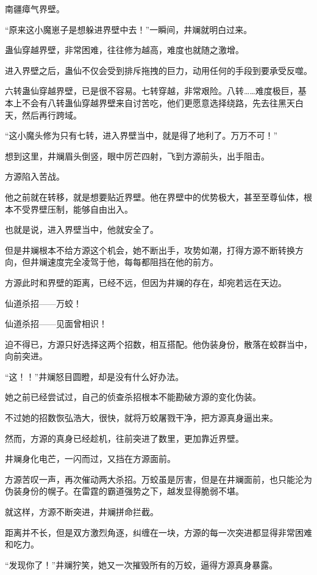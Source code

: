 \begin{this_body}
南疆瘴气界壁。

“原来这小魔崽子是想躲进界壁中去！”一瞬间，井斓就明白过来。

蛊仙穿越界壁，非常困难，往往修为越高，难度也就随之激增。

进入界壁之后，蛊仙不仅会受到排斥拖拽的巨力，动用任何的手段到要承受反噬。

六转蛊仙穿越界壁，已是很不容易。七转穿越，非常艰险。八转……难度极巨，基本上不会有八转蛊仙穿越界壁来自讨苦吃，他们更愿意选择绕路，先去往黑天白天，然后再行跨域。

“这小魔头修为只有七转，进入界壁当中，就是得了地利了。万万不可！”

想到这里，井斓眉头倒竖，眼中厉芒四射，飞到方源前头，出手阻击。

方源陷入苦战。

他之前就在转移，就是想要贴近界壁。他在界壁中的优势极大，甚至至尊仙体，根本不受界壁压制，能够自由出入。

也就是说，进入界壁当中，他就安全了。

但是井斓根本不给方源这个机会，她不断出手，攻势如潮，打得方源不断转换方向，但井斓速度完全凌驾于他，每每都阻挡在他的前方。

方源此时和界壁的距离，已经不远，但因为井斓的存在，却宛若远在天边。

仙道杀招——万蛟！

仙道杀招——见面曾相识！

迫不得已，方源只好选择这两个招数，相互搭配。他伪装身份，散落在蛟群当中，向前突进。

“这！！”井斓怒目圆瞪，却是没有什么好办法。

她之前已经尝试过，自己的侦查杀招根本不能勘破方源的变化伪装。

不过她的招数恢弘浩大，很快，就将万蛟屠戮干净，把方源真身逼出来。

然而，方源的真身已经趁机，往前突进了数里，更加靠近界壁。

井斓身化电芒，一闪而过，又挡在方源面前。

方源苦叹一声，再次催动两大杀招。万蛟虽是厉害，但是在井斓面前，也只能沦为伪装身份的幌子。在雷霆的霸道强势之下，越发显得脆弱不堪。

就这样，方源不断突进，井斓拼命拦截。

距离并不长，但是双方激烈角逐，纠缠在一块，方源的每一次突进都显得非常困难和吃力。

“发现你了！”井斓狞笑，她又一次摧毁所有的万蛟，逼得方源真身暴露。


\end{this_body}
